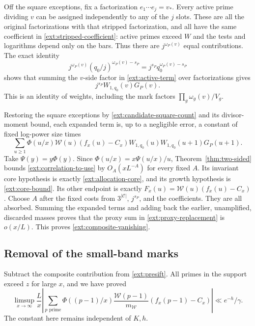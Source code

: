 Off the square exceptions, fix a factorization
$e_1\cdots e_j=v_*$.  Every active prime dividing $v$ can be
assigned independently to any of the $j$ slots.  These are all
the original factorizations with that stripped factorization,
and all have the same coefficient in
\eqref{ext:stripped-coefficient}: active primes exceed $W$ and
the tests and logarithms depend only on the bars.  Thus there
are $j^{\omega_P(v)}$ equal contributions.  The exact identity
\begin{equation}\label{ext:allocation-identity}
 j^{\omega_P(v)}(q_0/j)^{\omega_P(v)-s_P}
     =j^{s_P}q_0^{\omega_P(v)-s_P}
\end{equation}
shows that summing the $v$-side factor in
\eqref{ext:active-term} over factorizations gives
\[
 j^{s_P}W_{1,q_0}(v)G_P(v).
\]
This is an identity of weights, including the mark factors
$\prod_g\omega_g(v)/V_g$.

Restoring the square exceptions by
\eqref{ext:candidate-square-count} and its divisor-moment bound,
each expanded term is, up to a negligible error, a constant of
fixed log-power size times
\begin{equation}\label{ext:correlation-to-use}
 \sum_{u\geq1}\Phi(u/x)\mathcal W(u)(f_x(u)-C_x)
        W_{1,q_0}(u)W_{1,q_0}(u+1)G_P(u+1).
\end{equation}
Take $\Psi(y)=y\Phi(y)$.  Since
$\Phi(u/x)=x\Psi(u/x)/u$, Theorem~\ref{thm:two-sided} bounds
\eqref{ext:correlation-to-use} by $O_A(xL^{-A})$ for every
fixed $A$.  Its invariant core hypothesis is exactly
\eqref{ext:allocation-core}, and its growth hypothesis is
\eqref{ext:core-bound}.  Its other endpoint is exactly
$F_x(u)=\mathcal W(u)(f_x(u)-C_x)$.  Choose $A$ after the fixed
costs from $3^{|\mathcal C|}$, $j^{s_P}$, and the coefficients.
They are all absorbed.  Summing the expanded terms and adding
back the earlier, unamplified, discarded masses proves that the
proxy sum in \eqref{ext:proxy-replacement} is $o(x/L)$.
This proves \eqref{ext:composite-vanishing}.

\subsection{Removal of the small-band marks}

Subtract the composite contribution from
\eqref{ext:presift}.  All primes in the support exceed $z$ for
large $x$, and we have proved
\begin{equation}\label{ext:weighted-primes}
 \limsup_{x\to\infty}\frac Lx
 \left|\sum_{p\text{ prime}}\Phi((p-1)/x)
       \frac{\mathcal W(p-1)}{m_{\mathcal W}}
                    (f_x(p-1)-C_x)\right|
 \ll e^{-h}/\gamma.
\end{equation}
The constant here remains independent of $K,h$.

